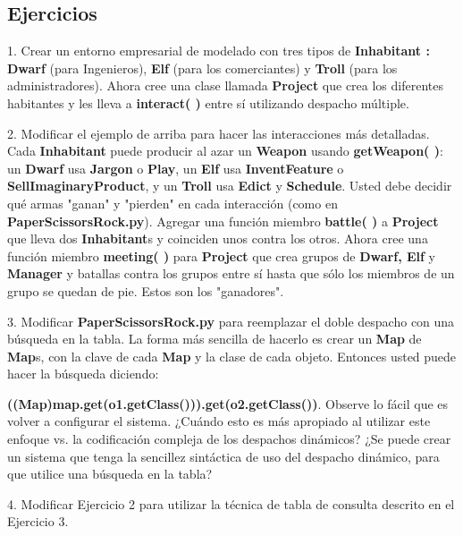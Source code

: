 \subsection*{Ejercicios}
\label{subsec:Ejercicios13}


1. Crear un entorno empresarial de modelado con tres tipos de \textbf{Inhabitant : Dwarf} (para Ingenieros), \textbf{Elf} (para los comerciantes) y \textbf{Troll} (para los administradores). Ahora cree una clase llamada \textbf{Project} que crea los diferentes habitantes y les lleva a \textbf{interact( )} entre sí utilizando despacho múltiple.   \newline

2. Modificar el ejemplo de arriba para hacer las interacciones más detalladas. Cada \textbf{Inhabitant} puede producir al azar un \textbf{Weapon} usando \textbf{getWeapon( )}: un \textbf{Dwarf} usa \textbf{Jargon} o \textbf{Play}, un \textbf{Elf} usa \textbf{InventFeature} o \textbf{SellImaginaryProduct}, y un \textbf{Troll} usa \textbf{Edict} y \textbf{Schedule}. Usted debe decidir qué armas "ganan" y "pierden" en cada interacción (como en \textbf{PaperScissorsRock.py}). Agregar una función miembro \textbf{battle( )} a \textbf{Project} que lleva dos \textbf{Inhabitant}s y coinciden unos contra los otros. Ahora cree una función miembro \textbf{meeting( )} para \textbf{Project} que crea grupos de \textbf{Dwarf, Elf} y \textbf{Manager} y batallas contra los grupos entre sí hasta que sólo los miembros de un grupo se quedan de pie.  Estos son los "ganadores".    \newline

3. Modificar \textbf{PaperScissorsRock.py} para reemplazar el doble despacho con una búsqueda en la tabla. La forma más sencilla de hacerlo es crear un \textbf{Map} de \textbf{Map}s, con la clave de cada \textbf{Map} y la clase de cada objeto. Entonces usted puede hacer la búsqueda diciendo: \par
\textbf{((Map)map.get(o1.getClass())).get(o2.getClass())}. \newline
Observe lo fácil que es volver a configurar el sistema. ¿Cuándo esto es más apropiado al utilizar este enfoque vs. la codificación compleja de los despachos dinámicos? ¿Se puede crear un sistema que tenga la sencillez sintáctica de uso del despacho dinámico, para que utilice una búsqueda en la tabla?   \newline

4. Modificar Ejercicio 2 para utilizar la técnica de tabla de consulta descrito en el Ejercicio 3.     \newline

\newpage
